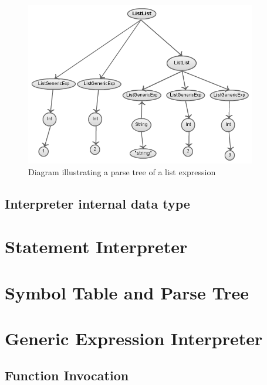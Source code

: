 \begin{figure}[H]
  \centering
	\includegraphics[width=0.90\textwidth]{pic/c6/parse_tree_2.png}
	\caption{Diagram illustrating a parse tree of a list expression}
\end{figure}


\subsection{Interpreter internal data type}

\section{Statement Interpreter}

\section{Symbol Table and Parse Tree}


\section{Generic Expression Interpreter}

\subsection{Function Invocation}
